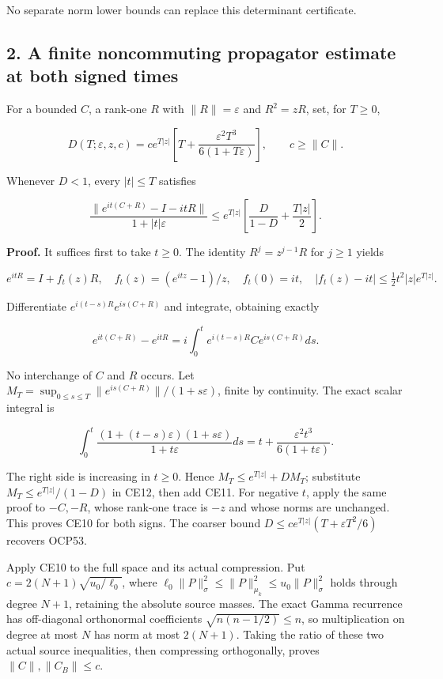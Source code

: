 \documentclass[10pt]{article}
\begin{document}
No separate norm lower bounds can replace this determinant certificate.

\subsection{2. A finite noncommuting propagator estimate at both signed times}\label{a-finite-noncommuting-propagator-estimate-at-both-signed-times}

For a bounded \(C\), a rank-one \(R\) with \(\|R\|=\varepsilon\) and \(R^2=zR\), set, for \(T\ge0\),

\[
D(T;\varepsilon,z,c)=c e^{T|z|}
\left[T+\frac{\varepsilon^2T^3}{6(1+T\varepsilon)}\right],\qquad c\ge\|C\|. \tag{CE9}
\]

Whenever \(D<1\), every \(|t|\le T\) satisfies

\[
\frac{\|e^{it(C+R)}-I-itR\|}{1+|t|\varepsilon}
\le e^{T|z|}\left[\frac D{1-D}+\frac{T|z|}{2}\right]. \tag{CE10}
\]

\textbf{Proof.} It suffices first to take \(t\ge0\). The identity \(R^j=z^{j-1}R\) for \(j\ge1\) yields

\[
e^{itR}=I+f_t(z)R,\quad f_t(z)=(e^{itz}-1)/z,
\quad f_t(0)=it,
\quad |f_t(z)-it|\le \tfrac12 t^2|z|e^{T|z|}. \tag{CE11}
\]

Differentiate \(e^{i(t-s)R}e^{is(C+R)}\) and integrate, obtaining exactly

\[
e^{it(C+R)}-e^{itR}=i\int_0^t e^{i(t-s)R}C e^{is(C+R)}ds. \tag{CE12}
\]

No interchange of \(C\) and \(R\) occurs. Let \(M_T=\sup_{0\le s\le T}\|e^{is(C+R)}\|/(1+s\varepsilon)\), finite by continuity. The exact scalar integral is

\[
\int_0^t\frac{(1+(t-s)\varepsilon)(1+s\varepsilon)}{1+t\varepsilon}ds
=t+\frac{\varepsilon^2t^3}{6(1+t\varepsilon)}. \tag{CE13}
\]

The right side is increasing in \(t\ge0\). Hence \(M_T\le e^{T|z|}+DM_T\); substitute \(M_T\le e^{T|z|}/(1-D)\) in CE12, then add CE11. For negative \(t\), apply the same proof to \(-C,-R\), whose rank-one trace is \(-z\) and whose norms are unchanged. This proves CE10 for both signs. The coarser bound \(D\le c e^{T|z|}(T+\varepsilon T^2/6)\) recovers OCP53.

Apply CE10 to the full space and its actual compression. Put \(c=2(N+1)\sqrt{u_0/\ell_0}\), where \(\ell_0\|P\|_\sigma^2\le\|P\|_{\mu_k}^2\le u_0\|P\|_\sigma^2\) holds through degree \(N+1\), retaining the absolute source masses. The exact Gamma recurrence has off-diagonal orthonormal coefficients \(\sqrt{n(n-1/2)}\le n\), so multiplication on degree at most \(N\) has norm at most \(2(N+1)\). Taking the ratio of these two actual source inequalities, then compressing orthogonally, proves \(\|C\|,\|C_B\|\le c\).
\end{document}
